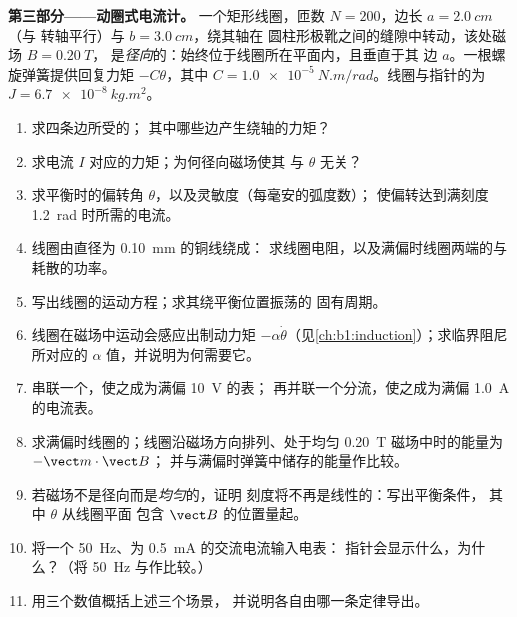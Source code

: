 \begin{problem}
\medskip
\noindent\textbf{第三部分——动圈式电流计。}
一个矩形线圈，匝数 $N = 200$，边长 $a = \qty{2.0}{cm}$（与
转轴平行）与 $b = \qty{3.0}{cm}$，绕其轴在
圆柱形极靴之间的缝隙中转动，该处磁场 $B = \qty{0.20}{T}$，
是\emph{径向}的：始终位于线圈所在平面内，且垂直于其
边 $a$。一根螺旋弹簧提供回复力矩 $-C\theta$，其中
$C = \qty{1.0e-5}{N.m/rad}$。线圈与指针的为
$J = \qty{6.7e-8}{kg.m^2}$。
\begin{enumerate}[resume]
  \item 求四条边所受的；
        其中哪些边产生绕轴的力矩？
  \item 求电流 $I$ 对应的力矩；为何径向磁场使其
        与 $\theta$ 无关？
  \item 求平衡时的偏转角 $\theta$，以及灵敏度（每毫安的弧度数）；
        使偏转达到满刻度 \qty{1.2}{rad} 时所需的电流。
  \item 线圈由直径为 \qty{0.10}{mm} 的铜线绕成：
        求线圈电阻，以及满偏时线圈两端的与
        耗散的功率。
  \item 写出线圈的运动方程；求其绕平衡位置振荡的
        固有周期。
  \item 线圈在磁场中运动会感应出制动力矩
        $-\alpha\dot\theta$（见\cref{ch:b1:induction}）；求临界阻尼所对应的
        $\alpha$ 值，并说明为何需要它。
  \item 串联一个，使之成为满偏 \qty{10}{V} 的表；
        再并联一个分流，使之成为满偏 \qty{1.0}{A} 的电流表。
  \item 求满偏时线圈的；线圈沿磁场方向排列、处于均匀 \qty{0.20}{T} 磁场中时的能量为 $-\vect m\cdot
        \vect B$；
        并与满偏时弹簧中储存的能量作比较。
  \item 若磁场不是径向而是\emph{均匀}的，证明
        刻度将不再是线性的：写出平衡条件，
        其中 $\theta$ 从线圈平面
        包含 $\vect B$ 的位置量起。
  \item 将一个 \qty{50}{Hz}、为 \qty{0.5}{mA} 的交流电流输入电表：
        指针会显示什么，为什么？（将 \qty{50}{Hz}
        与作比较。）
  \item 用三个数值概括上述三个场景，
        并说明各自由哪一条定律导出。
\end{enumerate}
\end{problem}
